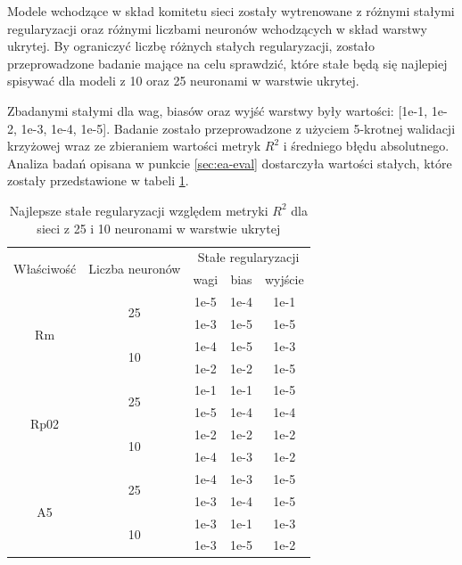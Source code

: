 Modele wchodzące w skład komitetu sieci zostały wytrenowane z różnymi stałymi regularyzacji oraz różnymi liczbami neuronów wchodzących w skład warstwy ukrytej. By ograniczyć liczbę różnych stałych regularyzacji, zostało przeprowadzone badanie mające na celu sprawdzić, które stałe będą się najlepiej spisywać dla modeli z 10 oraz 25 neuronami w warstwie ukrytej. 

Zbadanymi stałymi dla wag, biasów oraz wyjść warstwy były wartości:  [1e-1, 1e-2, 1e-3, 1e-4, 1e-5]. Badanie zostało przeprowadzone z użyciem 5-krotnej walidacji krzyżowej wraz ze zbieraniem wartości metryk $R^{2}$ i średniego błędu absolutnego. Analiza badań opisana w punkcie \ref{sec:ea-eval} dostarczyła wartości stałych, które zostały przedstawione w tabeli \ref{tab:regularization}.
\begin{table}
\caption{Najlepsze stałe regularyzacji względem metryki $R^{2}$ dla sieci z 25 i 10 neuronami w warstwie ukrytej}
    \label{tab:regularization}
    \centering
    \begin{tabular}{|c|c|c|c|c|}
        \hline
        \multirow{2}{*}{Właściwość} & \multirow{2}{*}{Liczba neuronów} & \multicolumn{3}{|c|}{Stałe regularyzacji} \\
        \cline{3-5}
        && wagi & bias & wyjście \\
         \hline
        \multirow{4}{*}{Rm} & \multirow{2}{*}{25} & 1e-5 & 1e-4 &1e-1 \\
        \cline{3-5}
        && 1e-3 &1e-5 & 1e-5 \\
        \cline{2-5}
        & \multirow{2}{*}{10} & 1e-4 & 1e-5 & 1e-3 \\ 
        \cline{3-5}
        && 1e-2	& 1e-2 &1e-5 \\
        \hline
        \multirow{4}{*}{Rp02} & \multirow{2}{*}{25} & 1e-1 &1e-1 & 1e-5 \\
        \cline{3-5}
        && 1e-5 &1e-4 &1e-4 \\
        \cline{2-5}
        & \multirow{2}{*}{10} & 1e-2 & 1e-2 & 1e-2 \\ 
        \cline{3-5}
        && 1e-4 & 1e-3 & 1e-2 \\
        \hline
        \multirow{4}{*}{A5} & \multirow{2}{*}{25} & 1e-4 & 1e-3&1e-5 \\
        \cline{3-5}
        && 1e-3&1e-4&1e-5 \\
        \cline{2-5}
        & \multirow{2}{*}{10} & 1e-3&1e-1&1e-3 \\ 
        \cline{3-5}
        && 1e-3	& 1e-5&	1e-2 \\

\end{tabular}
\end{table}
